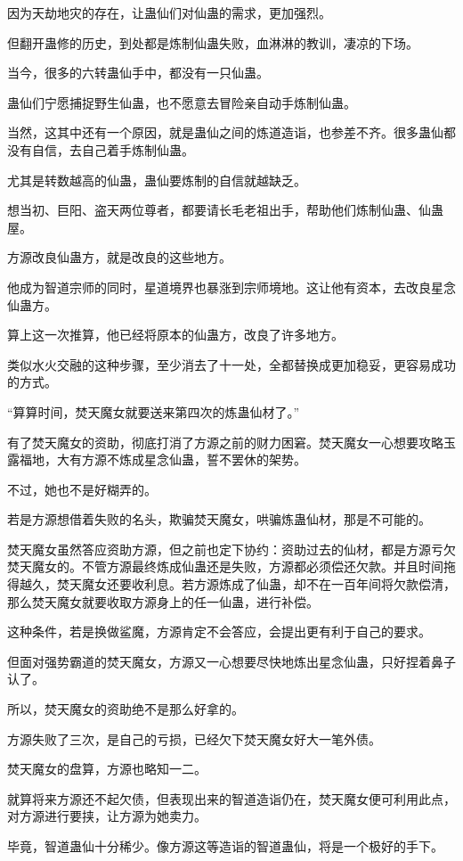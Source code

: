 \begin{this_body}
因为天劫地灾的存在，让蛊仙们对仙蛊的需求，更加强烈。

但翻开蛊修的历史，到处都是炼制仙蛊失败，血淋淋的教训，凄凉的下场。

当今，很多的六转蛊仙手中，都没有一只仙蛊。

蛊仙们宁愿捕捉野生仙蛊，也不愿意去冒险亲自动手炼制仙蛊。

当然，这其中还有一个原因，就是蛊仙之间的炼道造诣，也参差不齐。很多蛊仙都没有自信，去自己着手炼制仙蛊。

尤其是转数越高的仙蛊，蛊仙要炼制的自信就越缺乏。

想当初、巨阳、盗天两位尊者，都要请长毛老祖出手，帮助他们炼制仙蛊、仙蛊屋。

方源改良仙蛊方，就是改良的这些地方。

他成为智道宗师的同时，星道境界也暴涨到宗师境地。这让他有资本，去改良星念仙蛊方。

算上这一次推算，他已经将原本的仙蛊方，改良了许多地方。

类似水火交融的这种步骤，至少消去了十一处，全都替换成更加稳妥，更容易成功的方式。

“算算时间，焚天魔女就要送来第四次的炼蛊仙材了。”

有了焚天魔女的资助，彻底打消了方源之前的财力困窘。焚天魔女一心想要攻略玉露福地，大有方源不炼成星念仙蛊，誓不罢休的架势。

不过，她也不是好糊弄的。

若是方源想借着失败的名头，欺骗焚天魔女，哄骗炼蛊仙材，那是不可能的。

焚天魔女虽然答应资助方源，但之前也定下协约：资助过去的仙材，都是方源亏欠焚天魔女的。不管方源最终炼成仙蛊还是失败，方源都必须偿还欠款。并且时间拖得越久，焚天魔女还要收利息。若方源炼成了仙蛊，却不在一百年间将欠款偿清，那么焚天魔女就要收取方源身上的任一仙蛊，进行补偿。

这种条件，若是换做鲨魔，方源肯定不会答应，会提出更有利于自己的要求。

但面对强势霸道的焚天魔女，方源又一心想要尽快地炼出星念仙蛊，只好捏着鼻子认了。

所以，焚天魔女的资助绝不是那么好拿的。

方源失败了三次，是自己的亏损，已经欠下焚天魔女好大一笔外债。

焚天魔女的盘算，方源也略知一二。

就算将来方源还不起欠债，但表现出来的智道造诣仍在，焚天魔女便可利用此点，对方源进行要挟，让方源为她卖力。

毕竟，智道蛊仙十分稀少。像方源这等造诣的智道蛊仙，将是一个极好的手下。


\end{this_body}
